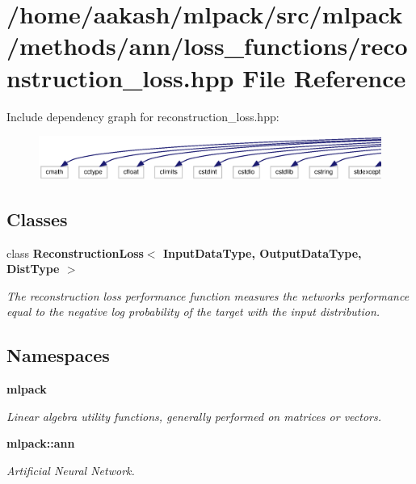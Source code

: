 \section{/home/aakash/mlpack/src/mlpack/methods/ann/loss\+\_\+functions/reconstruction\+\_\+loss.hpp File Reference}
\label{reconstruction__loss_8hpp}
Include dependency graph for reconstruction\+\_\+loss.\+hpp\+:
\nopagebreak
\begin{figure}[H]
\begin{center}
\leavevmode
\includegraphics[width=350pt]{reconstruction__loss_8hpp__incl}
\end{center}
\end{figure}
\subsection*{Classes}
\begin{DoxyCompactItemize}
\item 
class \textbf{ Reconstruction\+Loss$<$ Input\+Data\+Type, Output\+Data\+Type, Dist\+Type $>$}
\begin{DoxyCompactList}\small\item\em The reconstruction loss performance function measures the network\textquotesingle{}s performance equal to the negative log probability of the target with the input distribution. \end{DoxyCompactList}\end{DoxyCompactItemize}
\subsection*{Namespaces}
\begin{DoxyCompactItemize}
\item 
 \textbf{ mlpack}
\begin{DoxyCompactList}\small\item\em Linear algebra utility functions, generally performed on matrices or vectors. \end{DoxyCompactList}\item 
 \textbf{ mlpack\+::ann}
\begin{DoxyCompactList}\small\item\em Artificial Neural Network. \end{DoxyCompactList}\end{DoxyCompactItemize}



